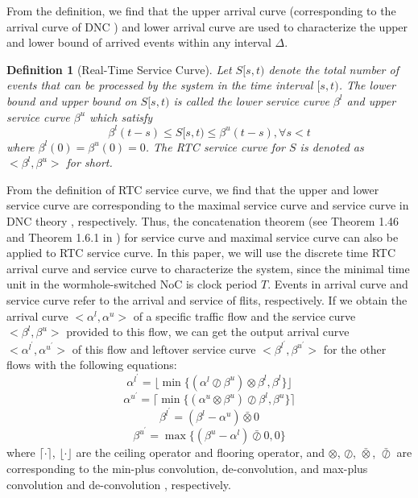 \documentclass[10pt,journal]{IEEEtran}
\newtheorem{definition}{Definition}
\begin{document}
From the definition, we find that the upper arrival curve (corresponding to the arrival curve of DNC \cite{Boudec2001Network}) and lower arrival curve are used to characterize the upper and lower bound of arrived events within any interval $\Delta$.

\begin{definition}[Real-Time Service Curve]
Let $S[s,t)$ denote the total number of events that can be processed by the system in the time interval $[s,t)$. The lower bound and upper bound on $S[s,t)$ is called the lower service curve $\beta^l$ and upper service curve $\beta^u$ which satisfy
$$\beta^l(t-s)\leq S[s,t)\leq \beta^u(t-s),\forall s<t$$
where $\beta^l(0)=\beta^u(0)=0$. The RTC service curve for $S$ is denoted as $<\beta^l,\beta^u>$ for short.
\end{definition}

From the definition of RTC service curve, we find that the upper and lower service curve are corresponding to the maximal service curve and service curve in DNC theory \cite{Boudec2001Network}, respectively. Thus, the concatenation theorem (see Theorem 1.46 and Theorem 1.6.1 in \cite{Boudec2001Network}) for service curve and maximal service curve can also be applied to RTC service curve. In this paper, we will use the discrete time RTC arrival curve and service curve to characterize the system, since the minimal time unit in the wormhole-switched NoC is clock period $T$. Events in arrival curve and service curve refer to the arrival and service of flits, respectively. If we obtain the arrival curve $<\alpha^l,\alpha^u>$ of a specific traffic flow and the service curve $<\beta^l,\beta^u>$ provided to this flow, we can get the output arrival curve $<\alpha^{l^\prime},\alpha^{u^\prime}>$ of this flow and leftover service curve $<\beta^{l^\prime},\beta^{u^\prime}>$ for the other flows with the following equations:
\begin{equation}\label{alphal}
\alpha^{l^\prime}=\lfloor\min\{(\alpha^l\oslash\beta^u)\otimes\beta^l,\beta^l\}\rfloor
\end{equation}
\begin{equation}\label{alphau}
\alpha^{u^\prime}=\lceil\min\{(\alpha^u\otimes\beta^u)\oslash\beta^l,\beta^u\}\rceil
\end{equation}
\begin{equation}\label{betal}
\beta^{l^\prime}=(\beta^l-\alpha^u)\bar{\otimes}0
\end{equation}
\begin{equation}\label{betau}
\beta^{u^\prime}=\max\{(\beta^u-\alpha^l)\bar{\oslash}0,0\}
\end{equation}
where $\lceil\cdot\rceil$, $\lfloor\cdot\rfloor$ are the ceiling operator and flooring operator, and $\otimes$, $\oslash$, $\bar{\otimes}$, $\bar{\oslash}$ are corresponding to the min-plus convolution, de-convolution, and max-plus convolution and de-convolution \cite{Boudec2001Network}, respectively.
\end{document}

